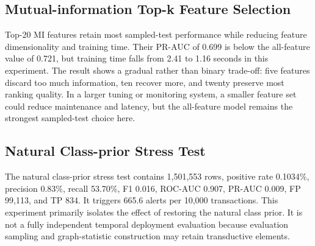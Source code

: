 \documentclass{article}
\begin{document}
\subsection{Mutual-information Top-k Feature Selection}
\begin{table}[H]
\centering
\caption{Top-k mutual-information feature selection with retraining.}
\end{table}
Top-20 MI features retain most sampled-test performance while reducing feature dimensionality and training time. Their PR-AUC of 0.699 is below the all-feature value of 0.721, but training time falls from 2.41 to 1.16 seconds in this experiment. The result shows a gradual rather than binary trade-off: five features discard too much information, ten recover more, and twenty preserve most ranking quality. In a larger tuning or monitoring system, a smaller feature set could reduce maintenance and latency, but the all-feature model remains the strongest sampled-test choice here.

\subsection{Natural Class-prior Stress Test}
The natural class-prior stress test contains 1,501,553 rows, positive rate 0.1034\%, precision 0.83\%, recall 53.70\%, F1 0.016, ROC-AUC 0.907, PR-AUC 0.009, FP 99,113, and TP 834. It triggers 665.6 alerts per 10,000 transactions. This experiment primarily isolates the effect of restoring the natural class prior. It is not a fully independent temporal deployment evaluation because evaluation sampling and graph-statistic construction may retain transductive elements.
\end{document}
